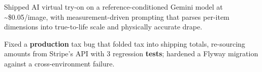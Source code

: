 \documentclass[letterpaper,10pt]{article}
\newcommand{\resumeItem}[1]{
  \item\small{
    {#1 \vspace{-3pt}}
  }
}
\begin{document}
        \resumeItem{Shipped AI virtual try-on on a reference-conditioned Gemini model at \textasciitilde\$0.05/image, with measurement-driven prompting that parses per-item dimensions into true-to-life scale and physically accurate drape.}
        \resumeItem{Fixed a \textbf{production} tax bug that folded tax into shipping totals, re-sourcing amounts from Stripe's API with 3 regression \textbf{tests}; hardened a Flyway migration against a cross-environment failure.}
\end{document}
